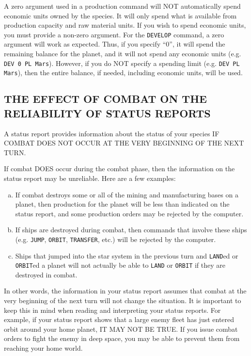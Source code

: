 \documentclass[10pt,titlepage]{article}
\begin{document}
A zero argument used in a production command will NOT automatically spend
economic units owned by the species.  It will only spend what is available from
production capacity and raw material units.  If you wish to spend economic
units, you must provide a non-zero argument.  For the \texttt{DEVELOP} command, a zero
argument will work as expected.  Thus, if you specify ``0'', it will spend the
remaining balance for the planet, and it will not spend any economic units
(e.g. \texttt{DEV 0 PL Mars}).  However, if you do NOT specify a spending limit (e.g.
\texttt{DEV PL Mars}), then the entire balance, if needed, including economic units,
will be used.


\subsection{THE EFFECT OF COMBAT ON THE RELIABILITY OF STATUS REPORTS}
\label{sec:effectofcombat}


A status report provides information about the status of your species IF COMBAT
DOES NOT OCCUR AT THE VERY BEGINNING OF THE NEXT TURN.

If combat DOES occur during the combat phase, then the information on the
status report may be unreliable.  Here are a few examples:
\begin{enumerate}[a.]
 \item  If combat destroys some or all of the mining and manufacturing
	bases on a planet, then production for the planet will be less
	than indicated on the status report, and some production orders
	may be rejected by the computer.

	\item If ships are destroyed during combat, then commands that involve
	these ships (e.g. \texttt{JUMP}, \texttt{ORBIT}, \texttt{TRANSFER}, etc.) will be rejected by
	the computer.

	\item Ships that jumped into the star system in the previous turn and
	\texttt{LAND}ed or \texttt{ORBIT}ed a planet will not actually be able to \texttt{LAND} or \texttt{ORBIT}
	if they are destroyed in combat.
\end{enumerate}
In other words, the information in your status report assumes that combat at
the very beginning of the next turn will not change the situation.  It is
important to keep this in mind when reading and interpreting your status
reports.  For example, if your status report shows that a large enemy fleet
has just entered orbit around your home planet, IT MAY NOT BE TRUE.  If you
issue combat orders to fight the enemy in deep space, you may be able to
prevent them from reaching your home world.
\end{document}
